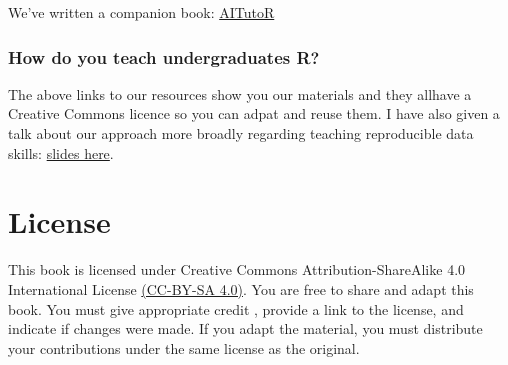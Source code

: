 \documentclass[
  oneside]{book}
\begin{document}
We've written a companion book: \href{https://psyteachr.github.io/AITutoR/}{AITutoR}

\subsection{How do you teach undergraduates R?}\label{how-do-you-teach-undergraduates-r}

The above links to our resources show you our materials and they allhave a Creative Commons licence so you can adpat and reuse them. I have also given a talk about our approach more broadly regarding teaching reproducible data skills: \href{https://osf.io/24c65}{slides here}.

\appendix


\chapter*{License}\label{license}

This book is licensed under Creative Commons Attribution-ShareAlike 4.0 International License \href{https://creativecommons.org/licenses/by-sa/4.0/}{(CC-BY-SA 4.0)}. You are free to share and adapt this book. You must give appropriate credit \citep{psyteachr-template}, provide a link to the license, and indicate if changes were made. If you adapt the material, you must distribute your contributions under the same license as the original.

  
\end{document}
